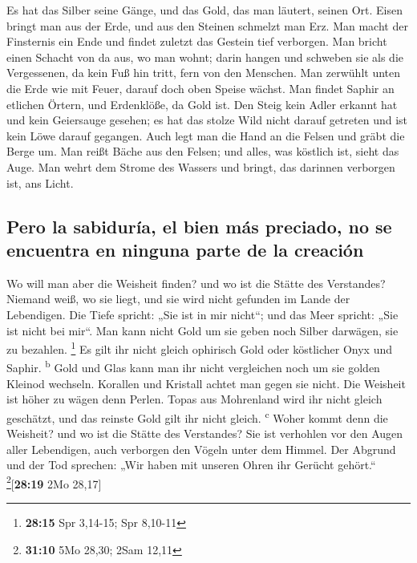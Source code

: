  Es hat das Silber seine Gänge, und das Gold, das man
läutert, seinen Ort.  Eisen bringt man aus der Erde, und
aus den Steinen schmelzt man Erz.  Man macht der
Finsternis ein Ende und findet zuletzt das Gestein tief verborgen.
 Man bricht einen Schacht von da aus, wo man wohnt; darin
hangen und schweben sie als die Vergessenen, da kein Fuß hin tritt, fern
von den Menschen.  Man zerwühlt unten die Erde wie mit
Feuer, darauf doch oben Speise wächst.  Man findet Saphir
an etlichen Örtern, und Erdenklöße, da Gold ist.  Den
Steig kein Adler erkannt hat und kein Geiersauge gesehen; 
es hat das stolze Wild nicht darauf getreten und ist kein Löwe darauf
gegangen.  Auch legt man die Hand an die Felsen und gräbt
die Berge um.  Man reißt Bäche aus den Felsen; und alles,
was köstlich ist, sieht das Auge.  Man wehrt dem Strome
des Wassers und bringt, das darinnen verborgen ist, ans Licht.

\hypertarget{pero-la-sabiduruxeda-el-bien-muxe1s-preciado-no-se-encuentra-en-ninguna-parte-de-la-creaciuxf3n}{%
\subsection{Pero la sabiduría, el bien más preciado, no se encuentra en
ninguna parte de la
creación}\label{pero-la-sabiduruxeda-el-bien-muxe1s-preciado-no-se-encuentra-en-ninguna-parte-de-la-creaciuxf3n}}

 Wo will man aber die Weisheit finden? und wo ist die
Stätte des Verstandes?  Niemand weiß, wo sie liegt, und
sie wird nicht gefunden im Lande der Lebendigen.  Die
Tiefe spricht: „Sie ist in mir nicht``; und das Meer spricht: „Sie ist
nicht bei mir``.  Man kann nicht Gold um sie geben noch
Silber darwägen, sie zu bezahlen. \footnote{\textbf{28:15} Spr 3,14-15;
  Spr 8,10-11}  Es gilt ihr nicht gleich ophirisch Gold
oder köstlicher Onyx und Saphir. \textsuperscript{b} 
Gold und Glas kann man ihr nicht vergleichen noch um sie golden Kleinod
wechseln.  Korallen und Kristall achtet man gegen sie
nicht. Die Weisheit ist höher zu wägen denn Perlen. 
Topas aus Mohrenland wird ihr nicht gleich geschätzt, und das reinste
Gold gilt ihr nicht gleich. \textsuperscript{c}  Woher
kommt denn die Weisheit? und wo ist die Stätte des Verstandes?
 Sie ist verhohlen vor den Augen aller Lebendigen, auch
verborgen den Vögeln unter dem Himmel.  Der Abgrund und
der Tod sprechen: „Wir haben mit unseren Ohren ihr Gerücht gehört.``
\footnote{\textbf{31:10} 5Mo 28,30; 2Sam 12,11}{[}\textbf{28:19} 2Mo
28,17{]}

